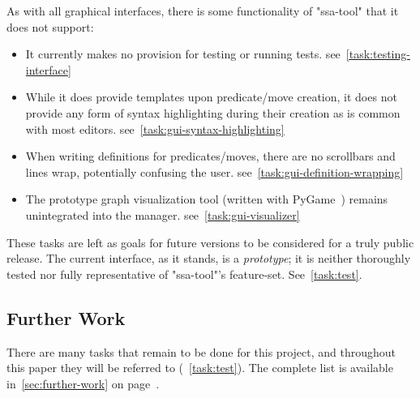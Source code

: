 As with all graphical interfaces,
  there is some functionality of "ssa-tool" that it does not support:
\begin{itemize}
\providecommand\TaskRef[1]{\hfill\mbox{see~\autoref{task:#1}}}
\item It currently makes no provision for testing or running tests.
  \TaskRef{testing-interface}
\item While it does provide templates upon predicate\slash move creation,
  it does not provide any form of syntax highlighting during their creation
  as is common with most editors.
  \TaskRef{gui-syntax-highlighting}
\item When writing definitions for predicates\slash moves,
  there are no scrollbars and lines wrap, potentially confusing the user.
  \TaskRef{gui-definition-wrapping}
\item The prototype graph visualization tool
  (written with PyGame~\autocite{pygame})
  remains unintegrated into the manager.
  \TaskRef{gui-visualizer}
\end{itemize}
These tasks are left as goals for future versions to be considered for a truly public release.
The current interface, as it stands, is a \emph{prototype}; it is neither thoroughly tested
  nor fully representative of "ssa-tool"'s feature-set.
See~\autoref{task:test}.

\subsection{Further Work}
There are many tasks that remain to be done for this project,
  and throughout this paper they will be referred to (\eg~\autoref{task:test}).
The complete list is available in~\autoref{sec:further-work} on page~\pageref{sec:further-work}.

